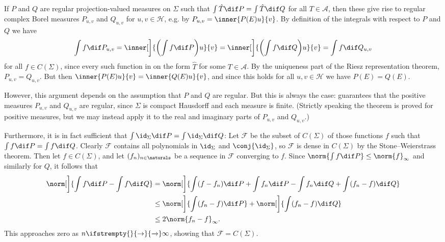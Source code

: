 \documentclass[article, a4paper, 11pt, oneside]{memoir}
\numberwithin{equation}{chapter}
\newcommand{\calF}{\mathcal{F}}
\newcommand{\calA}{\mathcal{A}}
\newcommand{\calH}{\mathcal{H}}
\renewcommand\to[1][]{%
    \ifstrempty{#1}{%
        \rightarrow
    }{%
        \xrightarrow[#1]{}
    }%
}
\begin{document}
\begin{remarkbreak}
    If $P$ and $Q$ are regular projection-valued measures on $\Sigma$ such that $\int \hat{T} \dif P = \int \hat{T} \dif Q$ for all $T \in \calA$, then these give rise to regular complex Borel measures $P_{u,v}$ and $Q_{u,v}$ for $u,v \in \calH$, e.g. by $P_{u,v} = \inner{P(E)u}{v}$. By definition of the integrals with respect to $P$ and $Q$ we have
    \begin{equation}
        \label{eq:spectral-theorem-uniqueness}
        \int f \dif P_{u,v}
            = \inner[\bigg]{ \biggl( \int f \dif P \biggr) u }{v}
            = \inner[\bigg]{ \biggl( \int f \dif Q \biggr) u }{v}
            = \int f \dif Q_{u,v}
    \end{equation}
    for all $f \in C(\Sigma)$, since every such function in on the form $\hat{T}$ for some $T \in \calA$. By the uniqueness part of the Riesz representation theorem, $P_{u,v} = Q_{u,v}$. But then $\inner{P(E)u}{v} = \inner{Q(E)u}{v}$, and since this holds for all $u,v \in \calH$ we have $P(E) = Q(E)$.

    However, this argument depends on the assumption that $P$ and $Q$ are regular. But this is always the case: \textcite[Theorem~7.8]{folland2007} guarantees that the positive measures $P_{u,v}$ and $Q_{u,v}$ are regular, since $\Sigma$ is compact Hausdorff and each measure is finite. (Strictly speaking the theorem is proved for positive measures, but we may instead apply it to the real and imaginary parts of $P_{u,v}$ and $Q_{u,v}$.)

    Furthermore, it is in fact sufficient that $\int \id_\Sigma \dif P = \int \id_\Sigma \dif Q$: Let $\calF$ be the subset of $C(\Sigma)$ of those functions $f$ such that $\int f \dif P = \int f \dif Q$. Clearly $\calF$ contains all polynomials in $\id_\Sigma$ and $\conj{\id_\Sigma}$, so $\calF$ is dense in $C(\Sigma)$ by the Stone--Weierstrass theorem. Then let $f \in C(\Sigma)$, and let $(f_n)_{n\in\naturals}$ be a sequence in $\calF$ converging to $f$. Since $\norm{\int f \dif P} \leq \norm{f}_\infty$ and similarly for $Q$, it follows that
    \begin{align*}
        \norm[\bigg]{ \int f \dif P - \int f \dif Q }
            &= \norm[\bigg]{ \int (f - f_n) \dif P + \int f_n \dif P - \int f_n \dif Q + \int (f_n - f) \dif Q } \\
            &\leq \norm[\bigg]{ \int (f_n - f) \dif P} + \norm[\bigg]{ \int (f_n - f) \dif Q } \\
            &\leq 2 \norm{f_n - f}_\infty.
    \end{align*}
    This approaches zero as $n \to \infty$, showing that $\calF = C(\Sigma)$.
\end{remarkbreak}
\end{document}
